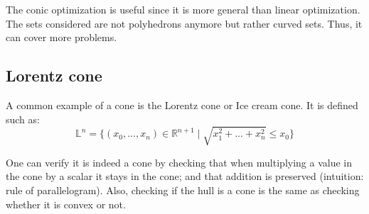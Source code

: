 The conic optimization is useful since it is more general than linear optimization. The sets considered are not polyhedrons anymore but rather curved sets. Thus, it can cover more problems.

\subsection{Lorentz cone}
A common example of a cone is the Lorentz cone or Ice cream cone. It is defined such as: 
\[
\mathbb{L}^n = \{(x_0,\dots, x_n) \in \mathbb{R}^{n+1} \mid \sqrt{x_1^2+...+x_n^2} \le x_0 \}
\]

One can verify it is indeed a cone by checking that when multiplying a value in the cone by a scalar it stays in the cone; and that addition is preserved (intuition: rule of parallelogram). Also, checking if the hull is a cone is the same as checking whether it is convex or not.

